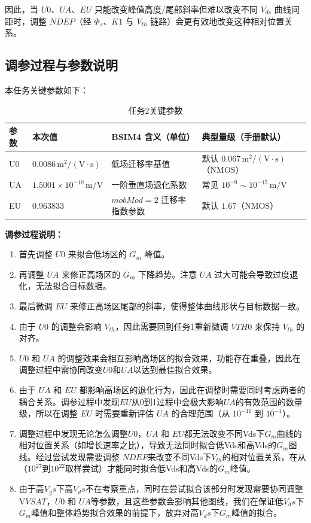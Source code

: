 \documentclass[12pt, a4paper, UTF8]{article}
\begin{document}
因此，当 \(U0\)、\(UA\)、\(EU\) 只能改变峰值高度/尾部斜率但难以改变不同 \(V_{ds}\) 曲线间距时，调整 \(NDEP\)（经 \(\Phi_s\)、\(K1\) 与 \(V_{th}\) 链路）会更有效地改变这种相对位置关系。

\subsection{调参过程与参数说明}
本任务关键参数如下：
\begin{table}[H]
	\centering
	\caption{任务2关键参数}
	\begin{tabular}{@{}llll@{}}
		\toprule
		参数 & 本次值 & BSIM4 含义（单位） & 典型量级（手册默认） \\
		\midrule
		U0 & \(0.0086\,\mathrm{m^2/(V\cdot s)}\) & 低场迁移率基值 & 默认 \(0.067\,\mathrm{m^2/(V\cdot s)}\)（NMOS） \\
		UA & \(1.5001\times10^{-10}\,\mathrm{m/V}\) & 一阶垂直场退化系数 & 常见 \(10^{-9}\sim10^{-15}\,\mathrm{m/V}\)\\
		EU & \(0.963833\) & \(mobMod=2\) 迁移率指数参数 & 默认 \(1.67\)（NMOS） \\
		\bottomrule
	\end{tabular}
\end{table}

\textbf{调参过程说明：}
\begin{enumerate}
    \item 首先调整 \(U0\) 来拟合低场区的 \(G_m\) 峰值。
    \item 再调整 \(UA\) 来修正高场区的 \(G_m\) 下降趋势。注意 \(UA\) 过大可能会导致过度退化，无法拟合目标数据。
    \item 最后微调 \(EU\) 来修正高场区尾部的斜率，使得整体曲线形状与目标数据一致。
    \item 由于 \(U0\) 的调整会影响 \(V_{th}\)，因此需要回到任务1重新微调 \(VTH0\) 来保持 \(V_{th}\) 的对齐。
    \item \(U0\) 和 \(UA\) 的调整效果会相互影响高场区的拟合效果，功能存在重叠，因此在调整过程中需协同改变\(U0\)和\(UA\)以达到最佳拟合效果。
    \item 由于 \(UA\) 和 \(EU\) 都影响高场区的退化行为，因此在调整时需要同时考虑两者的耦合关系。调参过程中发现\(EU\)从0到1过程中会极大影响\(UA\)的有效范围的数量级，所以在调整 \(EU\) 时需要重新评估 \(UA\) 的合理范围（从 \(10^{-11}\) 到 \(10^{-1}\)）。
    \item 调整过程中发现无论怎么调整\(U0\)，\(UA\) 和 \(EU\)都无法改变不同Vds下\(G_m\)曲线的相对位置关系（如增长速率之比），导致无法同时拟合低Vds和高Vds的\(G_m\)图线。经过尝试发现需要调整 \(NDEP\)来改变不同Vds下\(V_{th}\)的相对位置关系，在从（\(10^{27}\)到\(10^{22}\)取样尝试）才能同时拟合低Vds和高Vds的\(G_m\)峰值。
    \item 由于高\(V_gs\)下高\(V_ds\)不在考察重点，同时在尝试拟合该部分时发现需要协同调整V\(VSAT\)，\(U0\) 和 \(UA\)等参数，且这些参数会影响其他图线，我们在保证低\(V_ds\)下\(G_m\)峰值和整体趋势拟合效果的前提下，放弃对高\(V_ds\)下\(G_m\)峰值的拟合。
\end{enumerate}
\end{document}
